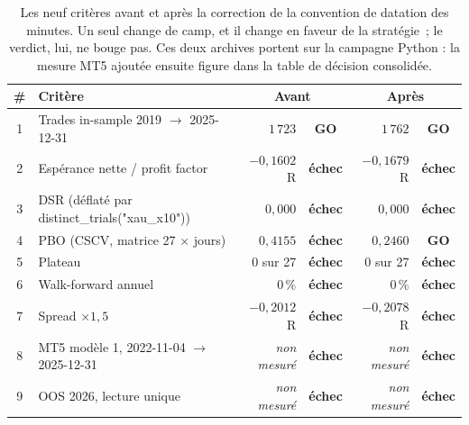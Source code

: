 \begin{table}[htbp]
\centering
\footnotesize
\caption{Les neuf critères avant et après la correction de la convention de datation des minutes. Un seul change de camp, et il change en faveur de la stratégie~; le verdict, lui, ne bouge pas. Ces deux archives portent sur la campagne Python : la mesure MT5 ajoutée ensuite figure dans la table de décision consolidée.}
\label{tab:x10_v1_v2}
\begin{tabular}{c p{4.6cm} r c r c}
\toprule
\textbf{\#} & \textbf{Critère} & \multicolumn{2}{c}{\textbf{Avant}} & \multicolumn{2}{c}{\textbf{Après}} \\
\midrule
1 & Trades in-sample 2019 $\rightarrow$ 2025-12-31 & $1\,723$ & \textcolor{rsiGreen}{\textbf{GO}} & $1\,762$ & \textcolor{rsiGreen}{\textbf{GO}} \\
2 & Espérance nette / profit factor & $-0{,}1602$ R & \textcolor{combinedBurgundy}{\textbf{échec}} & $-0{,}1679$ R & \textcolor{combinedBurgundy}{\textbf{échec}} \\
3 & DSR (déflaté par distinct\_trials("xau\_x10")) & $0{,}000$ & \textcolor{combinedBurgundy}{\textbf{échec}} & $0{,}000$ & \textcolor{combinedBurgundy}{\textbf{échec}} \\
4 & PBO (CSCV, matrice 27 $\times$ jours) & $0{,}4155$ & \textcolor{combinedBurgundy}{\textbf{échec}} & $0{,}2460$ & \textcolor{rsiGreen}{\textbf{GO}} \\
5 & Plateau & $0$ sur 27 & \textcolor{combinedBurgundy}{\textbf{échec}} & $0$ sur 27 & \textcolor{combinedBurgundy}{\textbf{échec}} \\
6 & Walk-forward annuel & $0$\,\% & \textcolor{combinedBurgundy}{\textbf{échec}} & $0$\,\% & \textcolor{combinedBurgundy}{\textbf{échec}} \\
7 & Spread $\times 1{,}5$ & $-0{,}2012$ R & \textcolor{combinedBurgundy}{\textbf{échec}} & $-0{,}2078$ R & \textcolor{combinedBurgundy}{\textbf{échec}} \\
8 & MT5 modèle 1, 2022-11-04 $\rightarrow$ 2025-12-31 & \emph{non mesuré} & \textcolor{combinedBurgundy}{\textbf{échec}} & \emph{non mesuré} & \textcolor{combinedBurgundy}{\textbf{échec}} \\
9 & OOS 2026, lecture unique & \emph{non mesuré} & \textcolor{combinedBurgundy}{\textbf{échec}} & \emph{non mesuré} & \textcolor{combinedBurgundy}{\textbf{échec}} \\
\bottomrule
\end{tabular}
\end{table}

